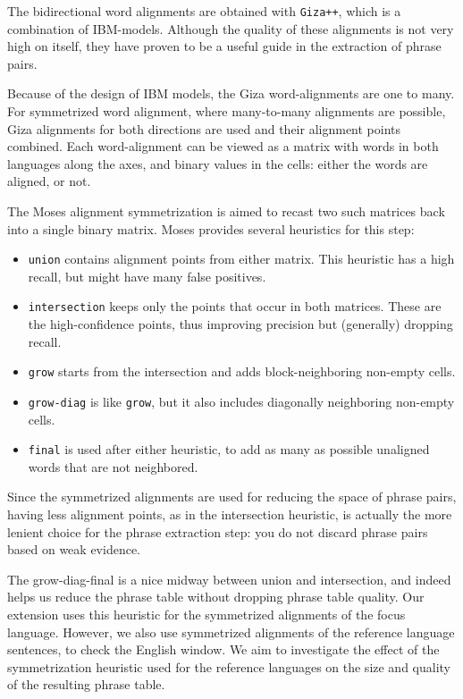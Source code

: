 \documentclass[11pt]{article}
\begin{document}
The bidirectional word alignments are obtained with {\tt Giza++}, which is a combination of IBM-models. Although the quality of these alignments is not very high on itself, they have proven to be a useful guide in the extraction of phrase pairs. 


 Because of the design of IBM models, the Giza word-alignments are one to many. For symmetrized word alignment, where many-to-many alignments are possible, Giza alignments for both directions are used and their alignment points combined. Each word-alignment can be viewed as a matrix with words in both languages along the axes, and binary values in the cells: either the words are aligned, or not. 

The Moses alignment symmetrization is aimed to recast two such matrices back into a single binary matrix. 
Moses provides several heuristics for this step:\begin{itemize}
\item {\tt union} contains alignment points from either matrix. This heuristic has a high recall, but might have many false positives.
\item  {\tt intersection} keeps only the points that occur in both matrices. These are the high-confidence points, thus improving precision but (generally) dropping recall.
\item {\tt grow} starts from the intersection and adds block-neighboring non-empty cells.
\item {\tt grow-diag} is like {\tt grow}, but it also includes diagonally neighboring non-empty cells.
\item {\tt final} is used after either heuristic, to add as many as possible unaligned words that are not neighbored.  %
\end{itemize}

Since the symmetrized alignments are used for reducing the space of phrase pairs, having less alignment points, as in the intersection heuristic, is actually the more lenient choice for the phrase extraction step: you do not discard phrase pairs based on weak evidence. 

The grow-diag-final is a nice midway between union and intersection, and indeed helps us reduce the phrase table without dropping phrase table quality. Our extension uses this heuristic for the symmetrized alignments of the focus language. However, we also use symmetrized alignments of the reference language sentences, to check the English window. We aim to investigate the effect of the symmetrization heuristic used for the reference languages on the size and quality of the resulting phrase table.
\end{document}

